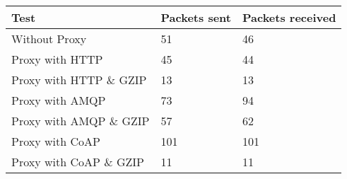 \begin{tabular}{|l|l|l|}
\hline
\textbf{Test} & \textbf{Packets sent} & \textbf{Packets received} \\ \hline
Without Proxy                    &51         & 46        \\ \hline 
Proxy with HTTP                  &45         & 44        \\ \hline 
Proxy with HTTP \& GZIP          &13         & 13        \\ \hline 
Proxy with AMQP                  &73         & 94        \\ \hline 
Proxy with AMQP \& GZIP          &57         & 62        \\ \hline 
Proxy with CoAP                  &101        & 101       \\ \hline 
Proxy with CoAP \& GZIP          &11         & 11        \\ \hline 
\end{tabular}